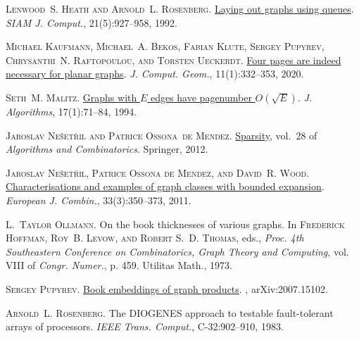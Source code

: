 \documentclass[kpfonts]{patmorin}
\begin{document}
\begin{thebibliography}{44}
	\textsc{Lenwood~S. Heath and Arnold~L. Rosenberg}.
	\newblock \href{https://doi.org/10.1137/0221055}{Laying out graphs using
		queues}.
	\newblock \emph{SIAM J. Comput.}, 21(5):927--958, 1992.

	\textsc{Michael Kaufmann, Michael~A. Bekos, Fabian Klute, Sergey Pupyrev,
		Chrysanthi~N. Raftopoulou, and Torsten Ueckerdt}.
	\newblock
	\href{https://journals.carleton.ca/jocg/index.php/jocg/article/view/504}{Four
		pages are indeed necessary for planar graphs}.
	\newblock \emph{J. Comput. Geom.}, 11(1):332--353, 2020.

	\textsc{Seth~M. Malitz}.
	\newblock \href{https://doi.org/10.1006/jagm.1994.1027}{Graphs with ${E}$ edges
		have pagenumber ${O}(\sqrt {E})$}.
	\newblock \emph{J. Algorithms}, 17(1):71--84, 1994.

	\textsc{Jaroslav Ne{\v{s}}et{\v{r}}il and Patrice Ossona~de Mendez}.
	\newblock \href{https://doi.org/10.1007/978-3-642-27875-4}{Sparsity}, vol.~28
	of \emph{Algorithms and Combinatorics}.
	\newblock Springer, 2012.

	\textsc{Jaroslav Ne{\v{s}}et{\v{r}}il, Patrice {Ossona de Mendez}, and David~R.
		Wood}.
	\newblock \href{https://doi.org/10.1016/j.ejc.2011.09.008}{Characterisations
		and examples of graph classes with bounded expansion}.
	\newblock \emph{European J. Combin.}, 33(3):350--373, 2011.

	\textsc{L.~Taylor Ollmann}.
	\newblock On the book thicknesses of various graphs.
	\newblock In \textsc{Frederick Hoffman, Roy~B. Levow, and Robert S.~D. Thomas},
	eds., \emph{Proc. 4th {S}outheastern {C}onference on {C}ombinatorics, {G}raph
		{T}heory and {C}omputing}, vol. VIII of \emph{Congr. Numer.}, p. 459.
	Utilitas Math., 1973.

	\textsc{Sergey Pupyrev}.
	\newblock \href{http://arxiv.org/abs/2007.15102}{Book embeddings of graph
		products}.
	, arXiv:2007.15102.

	\textsc{Arnold~L. Rosenberg}.
	\newblock The {DIOGENES} approach to testable fault-tolerant arrays of
	processors.
	\newblock \emph{IEEE Trans. Comput.}, C-32:902--910, 1983.


\end{thebibliography}
\end{document}
